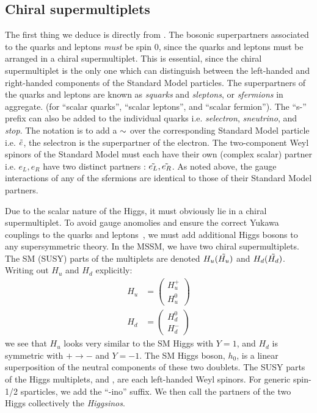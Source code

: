 \subsection{Chiral supermultiplets}

The first thing we deduce is directly from .
The bosonic superpartners associated to the quarks and leptons \textit{must} be spin 0, since the quarks and leptons must be arranged in a chiral supermultiplet.
This is essential, since the chiral supermultiplet is the only one which can distinguish between the left-handed and right-handed components of the Standard Model particles.
The superpartners of the quarks and leptons are known as \textit{squarks} and \textit{sleptons}, or \textit{sfermions} in aggregate. (for ``scalar quarks'', ``scalar leptons'', and ``scalar fermion'').
The ``s-'' prefix can also be added to the individual quarks i.e. \textit{selectron}, \textit{sneutrino}, and \textit{stop}.
The notation is to add a $\sim$ over the corresponding Standard Model particle i.e. $\tilde{e}$, the selectron is the superpartner of the electron.
The two-component Weyl spinors of the Standard Model must each have their own (complex scalar) partner i.e. $e_L, e_R$ have two distinct partners : $\tilde{e_L} ,\tilde{e_R}$.
As noted above, the gauge interactions of any of the sfermions are identical to those of their Standard Model partners.

Due to the scalar nature of the Higgs, it must obviously lie in a chiral supermultiplet.
To avoid gauge anomolies and ensure the correct Yukawa couplings to the quarks and leptons~\cite{susyPrimer}, we must add additional Higgs bosons to any supersymmetric theory.
In the MSSM, we have two chiral supermultiplets.
The SM (SUSY) parts of the multiplets are denoted $H_u (\tilde{H_u})$ and $H_d (\tilde{H_d})$.
Writing out $H_u$ and $H_d$ explicitly:
\begin{align}
H_u &= \begin{pmatrix} H_u^+ \\ H_u^0 \end{pmatrix}\\
H_d &= \begin{pmatrix} H_d^0 \\ H_d^- \end{pmatrix}
\end{align}
we see that $H_u$ looks very similar to the SM Higgs with $Y = 1$, and $H_d$ is symmetric with $+ \rightarrow -$ and $ Y = -1$.
The SM Higgs boson, $h_0$, is a linear superposition of the neutral components of these two doublets.
The SUSY parts of the Higgs multiplets,  and , are each left-handed Weyl spinors.
For generic spin-1/2 sparticles, we add the ``-ino'' suffix.
We then call the partners of the two Higgs collectively the \textit{Higgsinos}.

